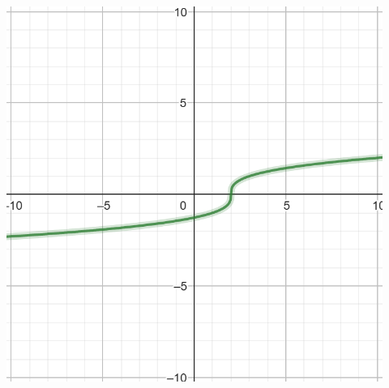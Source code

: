 \documentclass{article}
\begin{document}
\begin{description}
\begin{description}
        \item[] \begin{description} \includegraphics[scale=0.3]{img/1.png}\end{description}
    \end{description}
\end{description}
\end{document}

